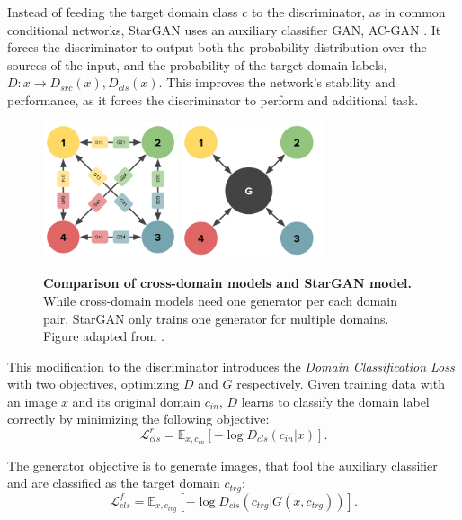 \documentclass{article}
\begin{document}
Instead of feeding the target domain class $c$ to the discriminator, as in common conditional networks, StarGAN uses an auxiliary classifier GAN, AC-GAN \cite{odena_conditional_2016}. It forces the discriminator to output both the probability distribution over the sources of the input, and the probability of the target domain labels, $D: x \rightarrow {D_{src}(x), D_{cls}(x)}$. This improves the network's stability and performance, as it forces the discriminator to perform and additional task.

\begin{figure}[t]
\centering
{}
{\includegraphics[height=4cm]{StarGAN_graph}}\hspace{1cm}
{\includegraphics[height=4cm]{StarGAN_graph2}}
\caption{\label{fig:stargan_topo} \textbf{Comparison of cross-domain models and StarGAN model.} While cross-domain models need one generator per each domain pair, StarGAN only trains one generator for multiple domains. Figure adapted from \cite{choi_stargan:_2017}.}
\end{figure}

This modification to the discriminator introduces the \textit{Domain Classification Loss} with two objectives, optimizing $D$ and $G$ respectively. Given training data with an image $x$ and its original domain $c_{in}$, $D$ learns to classify the domain label correctly by minimizing the following objective:
\begin{equation}
\mathcal{L}^{r}_{cls} = \mathbb{E}_{x,c_{in}}[-\log D_{cls}(c_{in}|x)].
\label{eq:stargan_clsr}
\end{equation}

The generator objective is to generate images, that fool the auxiliary classifier and are classified as the target domain $c_{trg}$:
\begin{equation}
\mathcal{L}^{f}_{cls} = \mathbb{E}_{x,c_{trg}}[-\log D_{cls}(c_{trg}|G(x, c_{trg}))].
\label{eq:stargan_clsf}
\end{equation}
\end{document}
